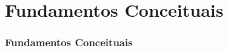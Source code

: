 \section{Fundamentos Conceituais}
\begin{frame}
\frametitle{Fundamentos Conceituais}
\label{cap-fundamentos-conceituais}

\end{frame}